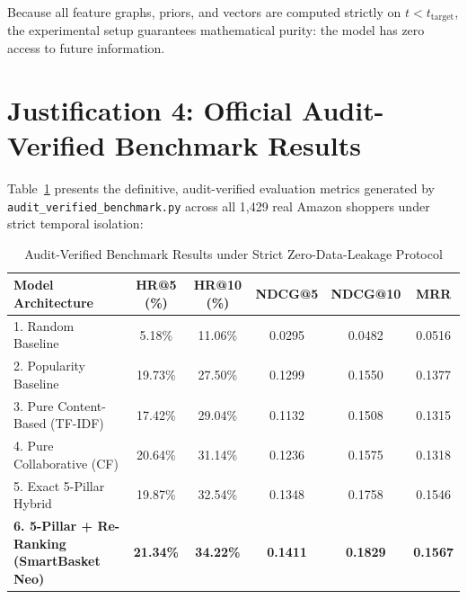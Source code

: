 \documentclass[11pt,a4paper]{article}
\begin{document}
\begin{tcolorbox}[title=Verification of Zero Data Leakage]
Because all feature graphs, priors, and vectors are computed strictly on $t < t_{\text{target}}$, the experimental setup guarantees mathematical purity: the model has zero access to future information.
\end{tcolorbox}

\section{Justification 4: Official Audit-Verified Benchmark Results}

Table~\ref{tab:verified_results} presents the definitive, audit-verified evaluation metrics generated by \texttt{audit\_verified\_benchmark.py} across all 1,429 real Amazon shoppers under strict temporal isolation:

\begin{table}[h!]
\centering
\small
\begin{tabular}{lccccc}
\toprule
\textbf{Model Architecture} & \textbf{HR@5 (\%)} & \textbf{HR@10 (\%)} & \textbf{NDCG@5} & \textbf{NDCG@10} & \textbf{MRR} \\
\midrule
1. Random Baseline & 5.18\% & 11.06\% & 0.0295 & 0.0482 & 0.0516 \\
2. Popularity Baseline & 19.73\% & 27.50\% & 0.1299 & 0.1550 & 0.1377 \\
3. Pure Content-Based (TF-IDF) & 17.42\% & 29.04\% & 0.1132 & 0.1508 & 0.1315 \\
4. Pure Collaborative (CF) & 20.64\% & 31.14\% & 0.1236 & 0.1575 & 0.1318 \\
5. Exact 5-Pillar Hybrid & 19.87\% & 32.54\% & 0.1348 & 0.1758 & 0.1546 \\
\textbf{6. 5-Pillar + Re-Ranking (SmartBasket Neo)} & \textbf{21.34\%} & \textbf{34.22\%} & \textbf{0.1411} & \textbf{0.1829} & \textbf{0.1567} \\
\bottomrule
\end{tabular}
\caption{Audit-Verified Benchmark Results under Strict Zero-Data-Leakage Protocol}
\label{tab:verified_results}
\end{table}
\end{document}
